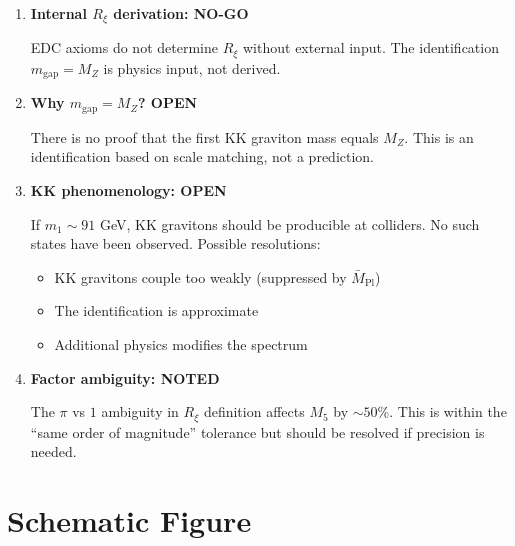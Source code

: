 \documentclass[11pt,a4paper]{article}
\newcommand{\Rxi}{R_\xi}
\newcommand{\Mplbar}{\bar{M}_{\mathrm{Pl}}}
\newcommand{\Mfive}{M_5}
\newcommand{\MZ}{M_Z}
\newcommand{\mgap}{m_{\mathrm{gap}}}
\begin{document}
\begin{tcolorbox}[title=Open Items, colback=yellow!10, colframe=orange!50]
\begin{enumerate}
\item \textbf{Internal $\Rxi$ derivation: NO-GO}

EDC axioms do not determine $\Rxi$ without external input. The identification
$\mgap = \MZ$ is physics input, not derived.

\item \textbf{Why $\mgap = \MZ$? OPEN}

There is no proof that the first KK graviton mass equals $\MZ$. This is an
identification based on scale matching, not a prediction.

\item \textbf{KK phenomenology: OPEN}

If $m_1 \sim 91$ GeV, KK gravitons should be producible at colliders. No such
states have been observed. Possible resolutions:
\begin{itemize}
\item KK gravitons couple too weakly (suppressed by $\Mplbar$)
\item The identification is approximate
\item Additional physics modifies the spectrum
\end{itemize}

\item \textbf{Factor ambiguity: NOTED}

The $\pi$ vs $1$ ambiguity in $\Rxi$ definition affects $\Mfive$ by $\sim 50\%$.
This is within the ``same order of magnitude'' tolerance but should be resolved
if precision is needed.
\end{enumerate}
\end{tcolorbox}

\section{Schematic Figure}
\end{document}
